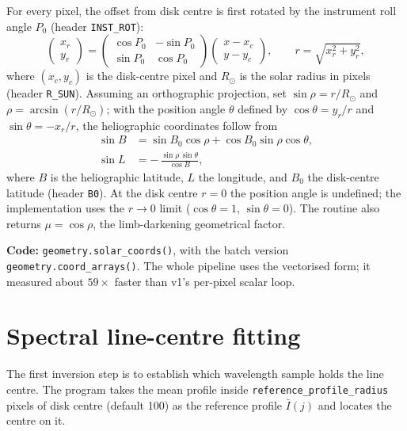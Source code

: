\documentclass[11pt,a4paper]{article}
\newcommand{\code}[1]{\texttt{\small #1}}
\newcommand{\Rsun}{R_{\odot}}
\begin{document}
For every pixel, the offset from disk centre is first rotated by the instrument
roll angle $P_0$ (header \code{INST\_ROT}):
\begin{equation}
\begin{pmatrix} x_r \\ y_r \end{pmatrix}
=
\begin{pmatrix} \cos P_0 & -\sin P_0 \\ \sin P_0 & \cos P_0 \end{pmatrix}
\begin{pmatrix} x - x_c \\ y - y_c \end{pmatrix},
\qquad
r = \sqrt{x_r^2 + y_r^2},
\end{equation}
where $(x_c, y_c)$ is the disk-centre pixel and $\Rsun$ is the solar radius in
pixels (header \code{R\_SUN}).  Assuming an orthographic projection, set
$\sin\rho = r/\Rsun$ and $\rho = \arcsin(r/\Rsun)$; with the position angle
$\theta$ defined by $\cos\theta = y_r/r$ and $\sin\theta = -x_r/r$, the
heliographic coordinates follow from
\begin{align}
  \sin B &= \sin B_0 \cos\rho + \cos B_0 \sin\rho \cos\theta, \\
  \sin L &= -\,\frac{\sin\rho\,\sin\theta}{\cos B},
\end{align}
where $B$ is the heliographic latitude, $L$ the longitude, and $B_0$ the
disk-centre latitude (header \code{B0}).  At the disk centre $r=0$ the position
angle is undefined; the implementation uses the $r\to0$ limit
($\cos\theta=1$, $\sin\theta=0$).  The routine also returns
$\mu = \cos\rho$, the limb-darkening geometrical factor.

\medskip
\noindent\textbf{Code:} \code{geometry.solar\_coords()}, with the batch version
\code{geometry.coord\_arrays()}.  The whole pipeline uses the vectorised form;
it measured about $59\times$ faster than v1's per-pixel scalar loop.

\section{Spectral line-centre fitting}
\label{sec:linecenter}

The first inversion step is to establish which wavelength sample holds the line
centre.  The program takes the mean profile inside
\code{reference\_profile\_radius} pixels of disk centre (default 100) as the
reference profile $\bar I(j)$ and locates the centre on it.
\end{document}
